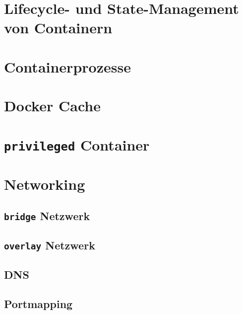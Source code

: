 \documentclass[../main.tex]{subfiles}
\begin{document}



  \section{Lifecycle- und State-Management von Containern}

  \section{Containerprozesse}
	\section{Docker Cache}
	\section{\texttt{privileged} Container}

	\section{Networking}
		\subsection{\texttt{bridge} Netzwerk}
		\subsection{\texttt{overlay} Netzwerk}
		\subsection{DNS}
		\subsection{Portmapping}
\end{document}
